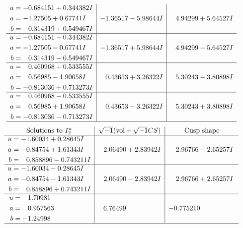 \documentclass[1p]{elsarticle_modified}
\theoremstyle{definition}
\newcommand{\I}{\sqrt{-1}}
\begin{document}
$$\begin{array}{c|c|c}
\begin{aligned}
u &= -0.684151 + 0.344382 I \\
a &= -1.27505 + 0.67741 I \\
b &= \phantom{-}0.314319 + 0.549467 I\end{aligned}
 & -1.36517 - 5.98644 I & \phantom{-}4.94299 + 5.64527 I \\ \hline\begin{aligned}
u &= -0.684151 - 0.344382 I \\
a &= -1.27505 - 0.67741 I \\
b &= \phantom{-}0.314319 - 0.549467 I\end{aligned}
 & -1.36517 + 5.98644 I & \phantom{-}4.94299 - 5.64527 I \\ \hline\begin{aligned}
u &= \phantom{-}0.460968 + 0.533555 I \\
a &= \phantom{-}0.56985 - 1.90658 I \\
b &= -0.813036 + 0.713273 I\end{aligned}
 & \phantom{-}0.43653 + 3.26322 I & \phantom{-}5.30243 - 3.80898 I \\ \hline\begin{aligned}
u &= \phantom{-}0.460968 - 0.533555 I \\
a &= \phantom{-}0.56985 + 1.90658 I \\
b &= -0.813036 - 0.713273 I\end{aligned}
 & \phantom{-}0.43653 - 3.26322 I & \phantom{-}5.30243 + 3.80898 I\\
 \hline 
 \end{array}$$\newpage$$\begin{array}{c|c|c}  
\text{Solutions to }I^u_{2}& \I (\text{vol} + \sqrt{-1}CS) & \text{Cusp shape}\\
 \hline 
\begin{aligned}
u &= -1.60034 + 0.28645 I \\
a &= -0.84754 + 1.61343 I \\
b &= \phantom{-}0.858896 - 0.743211 I\end{aligned}
 & \phantom{-}2.06490 + 2.83942 I & \phantom{-}2.96766 - 2.65257 I \\ \hline\begin{aligned}
u &= -1.60034 - 0.28645 I \\
a &= -0.84754 - 1.61343 I \\
b &= \phantom{-}0.858896 + 0.743211 I\end{aligned}
 & \phantom{-}2.06490 - 2.83942 I & \phantom{-}2.96766 + 2.65257 I \\ \hline\begin{aligned}
u &= \phantom{-}1.70981\phantom{ +0.000000I} \\
a &= \phantom{-}0.957563\phantom{ +0.000000I} \\
b &= -1.24998\phantom{ +0.000000I}\end{aligned}
 & \phantom{-}6.76499\phantom{ +0.000000I} & -0.775210\phantom{ +0.000000I}\\
 \hline 
 \end{array}$$\newpage
\end{document}
